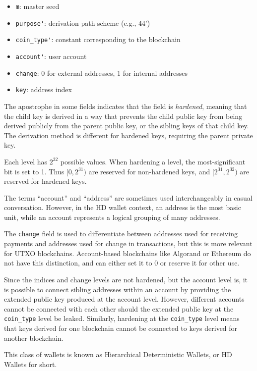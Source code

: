 \documentclass[12pt, a4paper, twocolumn]{article}
\begin{document}
\begin{itemize}[label=\textendash, itemsep=-0.5em]
  \item \verb=m=: master seed
  \item \verb=purpose'=: derivation path scheme (e.g., 44')
  \item \verb=coin_type'=: constant corresponding to the blockchain
  \item \verb=account'=: user account
  \item \verb=change=: 0 for external addresses, 1 for internal addresses
  \item \verb=key=: address index
\end{itemize}

The apostrophe in some fields indicates that the field is \emph{hardened}, meaning that the child key is derived in a way that prevents the child public key from being derived publicly from the parent public key, or the sibling keys of that child key.
The derivation method is different for hardened keys, requiring the parent private key.

Each level has $2^{32}$ possible values.
When hardening a level, the most-significant bit is set to 1.
Thus $[0, 2^{31})$ are reserved for non-hardened keys, and $[2^{31}, 2^{32})$ are reserved for hardened keys.

The terms ``account'' and ``address'' are sometimes used interchangeably in casual conversation.
However, in the HD wallet context, an address is the most basic unit, while an account represents a logical grouping of many addresses.

The \verb=change= field is used to differentiate between addresses used for receiving payments and addresses used for change in transactions, but this is more relevant for UTXO blockchains.
Account-based blockchains like Algorand or Ethereum do not have this distinction, and can either set it to 0 or reserve it for other use.

Since the indices and change levels are not hardened, but the account level is, it is possible to connect sibling addresses within an account by providing the extended public key produced at the account level.
However, different accounts cannot be connected with each other should the extended public key at the \verb=coin_type= level be leaked.
Similarly, hardening at the \verb=coin_type= level means that keys derived for one blockchain cannot be connected to keys derived for another blockchain.

This class of wallets is known as Hierarchical Deterministic Wallets, or HD Wallets for short.
\end{document}
